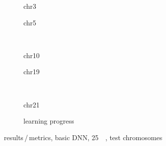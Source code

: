 \begin{figure}[p]
    \begin{subfigure}{0.45\textwidth}
        \scriptsize
        \caption{chr3}
    \end{subfigure} \hfill
    \begin{subfigure}{0.45\textwidth}
        \scriptsize
        \caption{chr5}
    \end{subfigure}\\[5mm]
    \begin{subfigure}{0.45\textwidth}
        \scriptsize
        \caption{chr10}
    \end{subfigure}\hfill
    \begin{subfigure}{0.45\textwidth}
        \scriptsize
        \caption{chr19}
    \end{subfigure}\\[3mm]
    \centering
    \begin{subfigure}{0.45\textwidth}
        \scriptsize
        \caption{chr21}
    \end{subfigure}\hfill
    \begin{subfigure}{0.45\textwidth}
        \caption{learning progress}\label{fig:results:basicDNN_lossEpochs_25}
    \end{subfigure}
    \caption{results\,/\,metrics, basic DNN, \SI{25}{\kilo\bp}, test chromosomes}
    \label{fig:results:basicDNN_pearson}
\end{figure}

